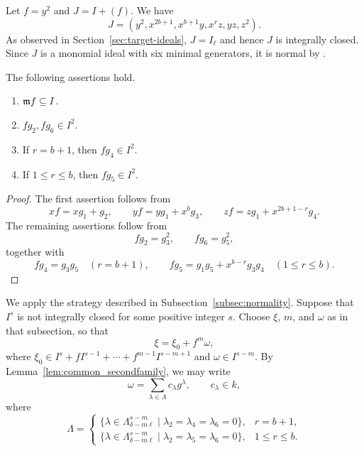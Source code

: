 Let $f=y^2$ and $J=I+(f)$.  We have
$$
 J=(y^2,x^{2b+1},x^{b+1}y,x^rz,yz,z^2).
$$
As observed in Section~\ref{sec:target-ideals}, $J=I_\ell$ and hence $J$
is integrally closed.  Since $J$ is a monomial ideal with six minimal
generators, it is normal by \cite{AtakaMatsuoka2026}.

\begin{lemma}\label{lem:common_secondfamily}
The following assertions hold.
\begin{enumerate}
 \item $\mathfrak m f\subseteq I$.
 \item $fg_2,fg_6\in I^2$.
 \item If $r=b+1$, then $fg_4\in I^2$.
 \item If $1\leq r\leq b$, then $fg_5\in I^2$.
\end{enumerate}
\end{lemma}

\begin{proof}
The first assertion follows from
$$
 xf=xg_1+g_2,\qquad
 yf=yg_1+x^bg_3,\qquad
 zf=zg_1+x^{2b+1-r}g_4.
$$
The remaining assertions follow from
$$
 fg_2=g_3^2,\qquad fg_6=g_5^2,
$$
together with
$$
 fg_4=g_3g_5\quad(r=b+1),\qquad
 fg_5=g_1g_5+x^{b-r}g_3g_4\quad(1\leq r\leq b).
$$
\end{proof}

We apply the strategy described in Subsection~\ref{subsec:normality}.
Suppose that $I^s$ is not integrally closed for some positive integer $s$.
Choose $\xi$, $m$, and $\omega$ as in that subsection, so that
$$
 \xi=\xi_0+f^m\omega,
$$
where
$\xi_0\in I^s+fI^{s-1}+\cdots+f^{m-1}I^{s-m+1}$ and
$\omega\in I^{s-m}$.  By Lemma~\ref{lem:common_secondfamily}, we may write
$$
 \omega=\sum_{\lambda\in\Lambda}c_\lambda g^\lambda,
 \qquad c_\lambda\in k,
$$
where
$$
 \Lambda=
 \begin{cases}
 \{\lambda\in\Lambda^{s-m}_{\delta-m\ell}
       \mid\lambda_2=\lambda_4=\lambda_6=0\},&r=b+1,\\
 \{\lambda\in\Lambda^{s-m}_{\delta-m\ell}
       \mid\lambda_2=\lambda_5=\lambda_6=0\},&1\leq r\leq b.
 \end{cases}
$$

